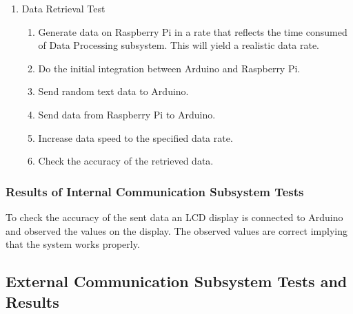 \documentclass[a4paper,12pt]{article}
\begin{document}
\begin{enumerate}

\item Data Retrieval Test

\begin{enumerate}

\item Generate data on Raspberry Pi in a rate that reflects the time consumed of Data Processing subsystem. This will yield a realistic data rate.  

\item Do the initial integration between Arduino and Raspberry Pi.

\item Send random text data to Arduino.  

\item Send data from Raspberry Pi to Arduino.  

\item Increase data speed to the specified data rate.  

\item Check the accuracy of the retrieved data. 

\end{enumerate}

\end{enumerate}


\subsubsection*{Results of Internal Communication Subsystem Tests}

	To check the accuracy of the sent data an LCD display is connected to Arduino and observed the values on the display. The observed values are correct implying that the system works properly.
	






\subsection {External Communication Subsystem Tests and Results}
\end{document}
